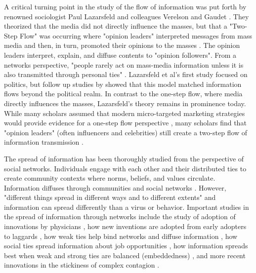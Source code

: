 A critical turning point in the study of the flow of information was put forth
by renowned sociologist Paul Lazarsfeld and colleagues Verelson and Gaudet
\citeyearpar{lazarsfeldPeopleChoice1944}. They theorized that the media did not
directly influence the masses, but that a "Two-Step Flow" was occurring where
"opinion leaders" interpreted messages from mass media and then, in turn,
promoted their opinions to the masses \citep{katzPersonalInfluencePart1955}. The
opinion leaders interpret, explain, and diffuse contents to "opinion followers".
From a networks perspective, "people rarely act on mass-media information unless
it is also transmitted through personal ties" \citep[p.
1374]{granovetterStrengthWeakTies1973}. Lazarsfeld et al's
\citeyearpar{lazarsfeldPeopleChoice1944} first study focused on politics, but
follow up studies by \citet{katzPersonalInfluencePart1955} showed that this
model matched information flows beyond the political realm. In contrast to the
one-step flow, where media directly influences the masses, Lazarsfeld's theory
remains in prominence today. While many scholars assumed that modern
micro-targeted marketing strategies would provide evidence for a one-step flow
perspective \citep{bennettOneStepFlowCommunication2006}, many scholars find that
"opinion leaders" (often influencers and celebrities) still create a two-step
flow of information transmission \citep{choi15, hilbertOneStepTwo2017}.

The spread of information has been thoroughly studied from the perspective of
social networks. Individuals engage with each other and their distributed ties
to create community contexts where norms, beliefs, and values circulate.
Information diffuses through communities and social networks
\citep{fowler2010cooperative, bond_etal12, klarEffectNetworkStructure2017}.
However, "different things spread in different ways and to different extents"
\citep[p. 563]{christakisSocialContagionTheory2013} and information can spread
differently than a virus or behavior. Important studies in the spread of
information through networks include the study of adoption of innovations by
physicians \citep{colemanDiffusionInnovationPhysicians1957}, how new inventions
are adopted from early adopters to laggards
\citep{rogersDiffusionInnovations1962}, how weak ties help bind networks and
diffuse information \citep{granovetterStrengthWeakTies1973}, how social ties
spread information about job opportunities
\citep{granovetterGettingJobStudy1995, montgomeryJobSearchNetwork1992}, how
information spreads best when weak and strong ties are balanced (embeddedness)
\citep{uzziSocialStructureCompetition1997}, and more recent innovations in the
stickiness of complex contagion \citep{centolaComplexContagionsWeakness2007}.

